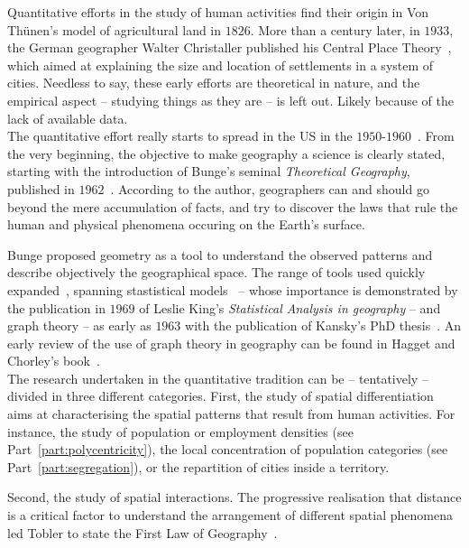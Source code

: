 Quantitative efforts in the study of human activities find their origin in Von
Th\"unen's model of agricultural land in $1826$. More than a century later,
in $1933$, the German geographer Walter Christaller published his Central Place
Theory~\cite{Christaller:1933}, which aimed at explaining the size and location
of settlements in a system of cities. Needless to say, these early efforts are
theoretical in nature, and the empirical aspect -- studying things as they are
-- is left out. Likely because of the lack of available data.\\

The quantitative effort really starts to spread in the US in the
$1950$-$1960$~\cite{Berry:1993}. From the very beginning, the objective to make
geography a science is clearly stated, starting with the introduction of Bunge's
seminal \emph{Theoretical Geography}, published in $1962$~\cite{Bunge:1962}.
According to the author, geographers can and should go beyond the mere
accumulation of facts, and try to discover the laws that rule the human and
physical phenomena occuring on the Earth's surface.   

Bunge proposed geometry as a tool to understand the observed patterns and
describe objectively the geographical space. The range of tools used quickly
expanded~\cite{Haggett:1966,Chorley:1968}, spanning stastistical
models~\cite{King:1969, Brunsdon:1998} -- whose importance is demonstrated by
the publication in $1969$ of Leslie King's \emph{Statistical Analysis in
geography} -- and graph theory  -- as early as $1963$ with the publication of
Kansky's PhD thesis~\cite{Kansky:1963}. An early review of the use of graph
theory in geography can be found in Hagget and Chorley's
book~\cite{Haggett:1969}.\\

The research undertaken in the quantitative tradition can be -- tentatively --
divided in three different categories. First, the study of spatial
differentiation aims at characterising the spatial patterns that result from
human activities. For instance, the study of population or employment densities
(see Part~\ref{part:polycentricity}), the local concentration of population
categories (see Part~\ref{part:segregation}), or the repartition of cities
inside a territory. 

Second, the study of spatial interactions. The progressive realisation that
distance is a critical factor to understand the arrangement of different spatial
phenomena led Tobler to state the First Law of Geography~\cite{Tobler:1970}. 

